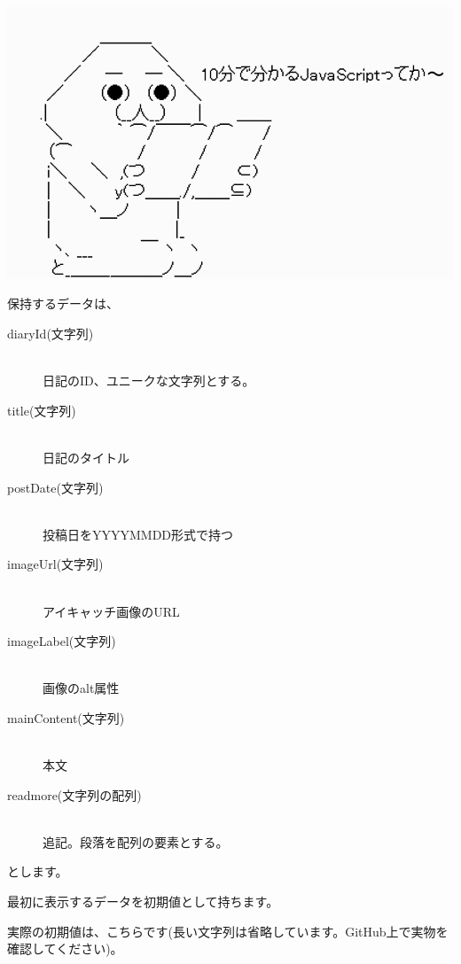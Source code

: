 \begin{reviewimage}[H]%
\includegraphics[width=0.6\maxwidth]{./images/03-todo-with-react/diaryData.png}%
\label{image:03-todo-with-react:diaryData}
\end{reviewimage}
\vspace*{\baselineskip}

保持するデータは、

\begin{description}
\item[diaryId(文字列)] \mbox{} \\
日記のID、ユニークな文字列とする。
\item[title(文字列)] \mbox{} \\
日記のタイトル
\item[postDate(文字列)] \mbox{} \\
投稿日をYYYYMMDD形式で持つ
\item[imageUrl(文字列)] \mbox{} \\
アイキャッチ画像のURL
\item[imageLabel(文字列)] \mbox{} \\
画像のalt属性
\item[mainContent(文字列)] \mbox{} \\
本文
\item[readmore(文字列の配列)] \mbox{} \\
追記。段落を配列の要素とする。
\end{description}

とします。

\vspace*{\baselineskip}

最初に表示するデータを初期値として持ちます。

実際の初期値は、こちらです(長い文字列は省略しています。GitHub上で実物を確認してください)。

